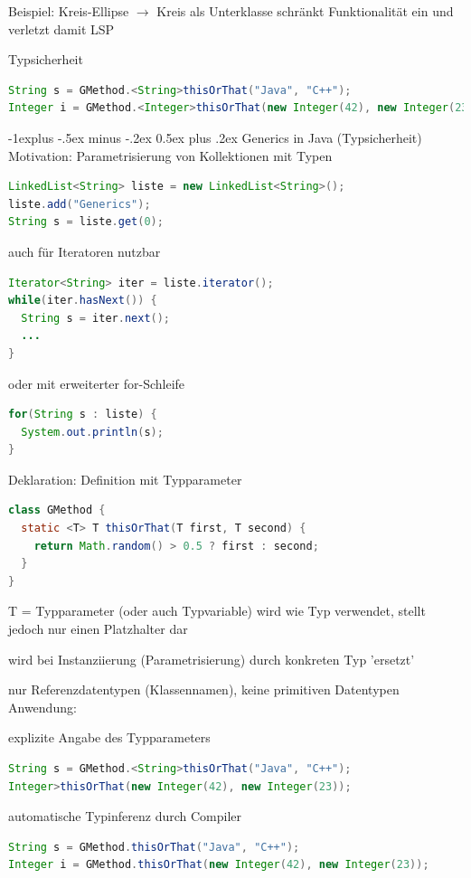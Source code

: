 \documentclass[10pt]{article}
\makeatletter
\renewcommand{\subsection}{\@startsection{subsection}{2}{0mm}%
                                {-1explus -.5ex minus -.2ex}%
                                {0.5ex plus .2ex}%
                                {\normalfont\normalsize\bfseries}}
\makeatother
\begin{document}
Beispiel: Kreis-Ellipse $\rightarrow$ Kreis als Unterklasse schränkt Funktionalität ein und verletzt damit LSP

Typsicherheit
\begin{lstlisting}[language=java]
String s = GMethod.<String>thisOrThat("Java", "C++");
Integer i = GMethod.<Integer>thisOrThat(new Integer(42), new Integer(23));
\end{lstlisting}

\subsection{Generics in Java (Typsicherheit)}
Motivation: Parametrisierung von Kollektionen mit Typen
\begin{lstlisting}[language=java]
LinkedList<String> liste = new LinkedList<String>();
liste.add("Generics");
String s = liste.get(0);
\end{lstlisting}

auch für Iteratoren nutzbar
\begin{lstlisting}[language=java]
Iterator<String> iter = liste.iterator();
while(iter.hasNext()) {
  String s = iter.next();
  ...
}
\end{lstlisting}

oder mit erweiterter for-Schleife
\begin{lstlisting}[language=java]
for(String s : liste) {
  System.out.println(s);
}
\end{lstlisting}

Deklaration: Definition mit Typparameter
\begin{lstlisting}[language=java]
class GMethod {
  static <T> T thisOrThat(T first, T second) {
    return Math.random() > 0.5 ? first : second;
  }
}
\end{lstlisting}

\begin{itemize*}
  \item T = Typparameter (oder auch Typvariable) wird wie Typ verwendet, stellt jedoch nur einen Platzhalter dar
  \item wird bei Instanziierung (Parametrisierung) durch konkreten Typ 'ersetzt'
  \item nur Referenzdatentypen (Klassennamen), keine primitiven Datentypen
  Anwendung:
  \item explizite Angabe des Typparameters
  \begin{lstlisting}[language=java]
String s = GMethod.<String>thisOrThat("Java", "C++");
Integer>thisOrThat(new Integer(42), new Integer(23));
  \end{lstlisting}
  \item automatische Typinferenz durch Compiler
  \begin{lstlisting}[language=java]
String s = GMethod.thisOrThat("Java", "C++");
Integer i = GMethod.thisOrThat(new Integer(42), new Integer(23));
  \end{lstlisting}
\end{itemize*}
\end{document}
